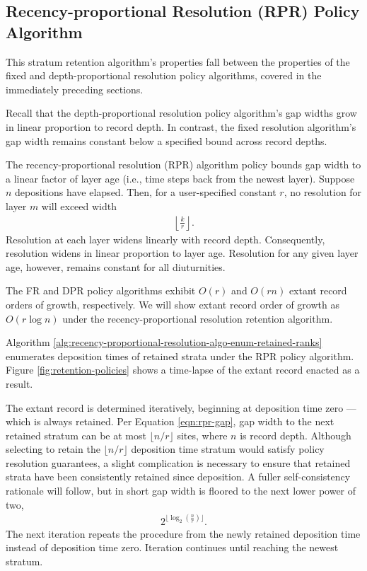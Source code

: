 \subsection{Recency-proportional Resolution (RPR) Policy Algorithm}
\label{sec:recency-proportional-resolution-algo}

This stratum retention algorithm's properties fall between the properties of the fixed and depth-proportional resolution policy algorithms, covered in the immediately preceding sections.

Recall that the depth-proportional resolution policy algorithm's gap widths grow in linear proportion to record depth.
In contrast, the fixed resolution algorithm's gap width remains constant below a specified bound across record depths.

The recency-proportional resolution (RPR) algorithm policy bounds gap width to a linear factor of layer age (i.e., time steps back from the newest layer).
Suppose $n$ depositions have elapsed.
Then, for a user-specified constant $r$, no resolution for layer $m$ will exceed width
\begin{align}
  \left\lfloor \frac{k}{r} \right\rfloor.
  \label{eqn:rpr-gap}
\end{align}
Resolution at each layer widens linearly with record depth.
Consequently, resolution widens in linear proportion to layer age.
Resolution for any given layer age, however, remains constant for all diuturnities.

The FR and DPR policy algorithms exhibit $O(r)$ and $O(rn)$ extant record orders of growth, respectively.
We will show extant record order of growth as $O(r\log{n})$ under the recency-proportional resolution retention algorithm.

Algorithm \ref{alg:recency-proportional-resolution-algo-enum-retained-ranks} enumerates deposition times of retained strata under the RPR policy algorithm.
Figure \ref{fig:retention-policies} shows a time-lapse of the extant record enacted as a result.

The extant record is determined iteratively, beginning at deposition time zero --- which is always retained.
Per Equation \ref{eqn:rpr-gap}, gap width to the next retained stratum can be at most $\lfloor n/r \rfloor$ sites, where $n$ is record depth.
Although selecting to retain the $\lfloor n/r \rfloor$ deposition time stratum would satisfy policy resolution guarantees, a slight complication is necessary to ensure that retained strata have been consistently retained since deposition.
A fuller self-consistency rationale will follow, but in short gap width is floored to the next lower power of two,
\begin{align*}
  2^{\lfloor \log_{2}\left(\frac{n}{r}\right) \rfloor}.
\end{align*}
The next iteration repeats the procedure from the newly retained deposition time instead of deposition time zero.
Iteration continues until reaching the newest stratum.

